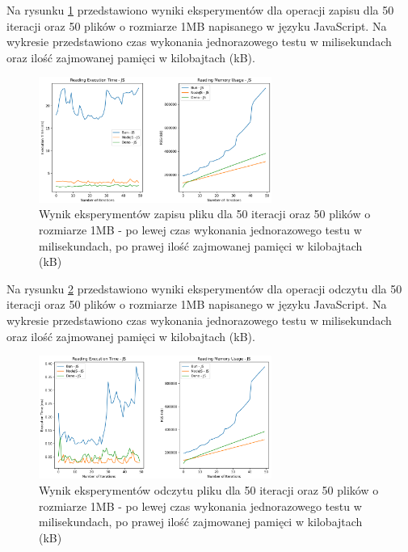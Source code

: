 Na rysunku \ref{fig:file_e2_reading_js} przedstawiono wyniki eksperymentów dla operacji zapisu dla 50 iteracji oraz 50 plików o rozmiarze 1MB napisanego w języku JavaScript. Na wykresie przedstawiono czas wykonania jednorazowego testu w milisekundach oraz ilość zajmowanej pamięci w kilobajtach (kB).

\begin{figure}[H]
  \centering
  \includegraphics[width=0.68\textwidth]{Figures/files/files_writing_50_2000_50_js.png}
  \caption{Wynik eksperymentów zapisu pliku dla 50 iteracji oraz 50 plików o rozmiarze 1MB - po lewej czas wykonania jednorazowego testu w milisekundach, po prawej ilość zajmowanej pamięci w kilobajtach (kB)}
  \label{fig:file_e2_reading_js}
\end{figure}

Na rysunku \ref{fig:file_e2_writing_js} przedstawiono wyniki eksperymentów dla operacji odczytu dla 50 iteracji oraz 50 plików o rozmiarze 1MB napisanego w języku JavaScript. Na wykresie przedstawiono czas wykonania jednorazowego testu w milisekundach oraz ilość zajmowanej pamięci w kilobajtach (kB).

\begin{figure}[H]
  \centering
  \includegraphics[width=0.68\textwidth]{Figures/files/files_reading_50_2000_50_js.png}
  \caption{Wynik eksperymentów odczytu pliku dla 50 iteracji oraz 50 plików o rozmiarze 1MB - po lewej czas wykonania jednorazowego testu w milisekundach, po prawej ilość zajmowanej pamięci w kilobajtach (kB)}
  \label{fig:file_e2_writing_js}
\end{figure}

